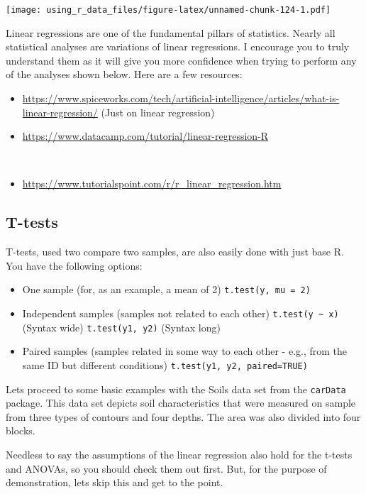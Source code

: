 \documentclass[
]{book}
\providecommand{\tightlist}{%
  \setlength{\itemsep}{0pt}\setlength{\parskip}{0pt}}
\begin{document}
\texttt{[image: using\_r\_data\_files/figure-latex/unnamed-chunk-124-1.pdf]}

Linear regressions are one of the fundamental pillars of statistics. Nearly all statistical analyses are variations of linear regressions. I encourage you to truly understand them as it will give you more confidence when trying to perform any of the analyses shown below. Here are a few resources:\\

\begin{itemize}
\tightlist
\item
  \url{https://www.spiceworks.com/tech/artificial-intelligence/articles/what-is-linear-regression/} (Just on linear regression)\\
\item
  \url{https://www.datacamp.com/tutorial/linear-regression-R}\strut \\
\item
  \url{https://www.tutorialspoint.com/r/r_linear_regression.htm}
\end{itemize}

\hypertarget{t-tests}{%
\subsection{T-tests}\label{t-tests}}

T-tests, used two compare two samples, are also easily done with just base R.
You have the following options:

\begin{itemize}
\item
  One sample (for, as an example, a mean of 2)
  \texttt{t.test(y,\ mu\ =\ 2)}
\item
  Independent samples (samples not related to each other)
  \texttt{t.test(y\ \textasciitilde{}\ x)} (Syntax wide)
  \texttt{t.test(y1,\ y2)} (Syntax long)
\item
  Paired samples (samples related in some way to each other - e.g., from the same ID but different conditions)
  \texttt{t.test(y1,\ y2,\ paired=TRUE)}
\end{itemize}

Lets proceed to some basic examples with the Soils data set from the \texttt{carData} package. This data set depicts soil characteristics that were measured on sample from three types of contours and four depths. The area was also divided into four blocks.

Needless to say the assumptions of the linear regression also hold for the t-tests and ANOVAs, so you should check them out first. But, for the purpose of demonstration, lets skip this and get to the point.
\end{document}
